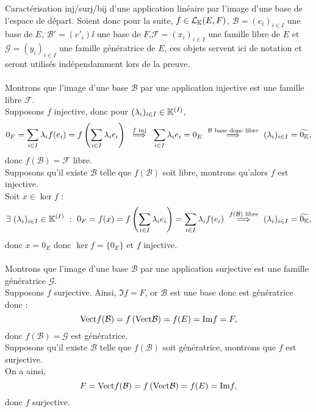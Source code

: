 \documentclass{article}
\renewenvironment{question_kholle}[2][ ]
{
	\subsection{\texorpdfstring{#2}{}}
	\notblank{#1}
	{
		\noindent #1
		\bigbreak
	}
	{}
	\begin{proof}
}
{
	\end{proof}
}
\begin{document}
	\begin{question_kholle}
		{Caractérisation inj/surj/bij d'une application linéaire par l'image d'une base de l'espace de départ.}
		Soient donc pour la suite, $f \in \mathcal{L}_{\mathbb K}(E,F)$, $\mathcal{B} = (e_i)_{i\in I}$ une base de $E$, $\mathcal{B}' = (e'_i)\ii$ une base de $F$,$\mathcal{F} = (x_i)_{i\in I}$ une famille libre de $E$ et $\mathcal{G} = (y_i)_{i \in I}$ une famille génératrice de $E$, ces objets servent ici de notation et seront utilisés indépendamment lors de la preuve. \\ \\
		Montrons que l'image d'une base $\mathcal{B}$ par une application injective est une famille libre $\mathcal{F}$. \\
		Supposons $f$ injective, donc pour $(\lambda_i)_{i \in I} \in \mathbb K^{(I)}$,
		\[
		0_F = \sum_{i\in  I}\bda_i f(e_i) = f \left( \sum_{i\in  I} \bda_i e_i \right) \ \overset{f \text{ inj}}{\implies} \ \sum_{i\in  I} \bda_i e_i = 0_E \ \overset{\mathcal{B} \text{ base donc libre}}{\implies} \ (\bda _i)_{i\in  I} = \widetilde{0_\K},
		\]
		donc $f(\mathcal{B})= \mathcal{F}$ libre. \\
		Supposons qu'il existe $\mathcal{B}$ telle que $f(\mathcal{B})$ soit libre, montrons qu'alors $f$ est injective. \\
		Soit $x \in \ker f$ :
		\[
		\exists \ (\lambda_i)_{i \in I} \in \mathbb K^{(I)} \ : \ 0_F = f(x) = f\left( \sum_{i \in I} \lambda_i e_i \right) =\sum _{i \in I} \lambda _i f(e_i) \  \overset{f(\mathcal{B}) \text{ libre}}{\implies} \ (\lambda _i)_{i\in  I} = \widetilde{0_{\mathbb K}},
		\]
		donc $x = 0_E$ donc $\ker f = \{0_E\}$ et $f$ injective. \\ \\
		Montrons que l'image d'une base $\mathcal{B}$ par une application surjective est une famille génératrice $\mathcal{G}$. \\
		Supposons $f$ surjective. Ainsi, $\Im f = F$, or $\mathcal{B}$ est une base donc est génératrice donc :
		\[
		\text{Vect} f(\mathcal{B}) = f\left( \text{Vect} \mathcal{B} \right) = f( E) = \text{Im} f = F,
		\]
		donc $f(\mathcal{B}) = \mathcal{G}$ est génératrice. \\
		Supposons qu'il existe $\mathcal{B}$ telle que $f(\mathcal{B})$ soit génératrice, montrons que $f$ est surjective. \\
		On a ainsi,
		\[
		F = \text{Vect} f(\mathcal{B}) = f \left( \text{Vect} \mathcal{B} \right) = f(E) = \text{Im} f,
		\]
		donc $f$ surjective. \\ \\

\end{question_kholle}
\end{document}
